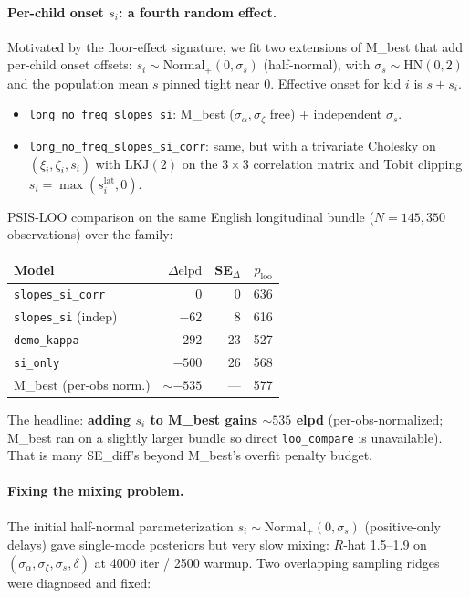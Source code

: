 \documentclass[11pt]{article}
\begin{document}
\paragraph{Per-child onset \(s_i\): a fourth random effect.}
\label{par:s-i}
Motivated by the floor-effect signature, we fit two extensions of
M\_best that add per-child onset offsets:
\(s_i \sim \mathrm{Normal}_+(0, \sigma_s)\) (half-normal), with
\(\sigma_s \sim \mathrm{HN}(0, 2)\) and the population mean \(s\)
pinned tight near 0. Effective onset for kid \(i\) is \(s + s_i\).
\begin{itemize}[leftmargin=1.3em]
\item \texttt{long\_no\_freq\_slopes\_si}: M\_best
  (\(\sigma_\alpha, \sigma_\zeta\) free) + independent \(\sigma_s\).
\item \texttt{long\_no\_freq\_slopes\_si\_corr}: same, but with a
  trivariate Cholesky on \((\xi_i, \zeta_i, s_i)\) with
  \(\mathrm{LKJ}(2)\) on the \(3{\times}3\) correlation matrix and
  Tobit clipping \(s_i = \max(s_i^{\text{lat}}, 0)\).
\end{itemize}
PSIS-LOO comparison on the same English longitudinal bundle
(\(N = 145{,}350\) observations) over the family:
\begin{center}
\begin{tabular}{@{}lrrr@{}}
\toprule
Model & \(\Delta\mathrm{elpd}\) & SE\(_{\Delta}\) & \(p_{\text{loo}}\) \\
\midrule
\texttt{slopes\_si\_corr}  & 0      & 0    & 636 \\
\texttt{slopes\_si} (indep)& \(-62\) & 8   & 616 \\
\texttt{demo\_kappa}       & \(-292\)& 23  & 527 \\
\texttt{si\_only}          & \(-500\)& 26  & 568 \\
M\_best (per-obs norm.)    & \(\sim{-535}\) & --- & 577 \\
\bottomrule
\end{tabular}
\end{center}
The headline: \textbf{adding \(s_i\) to M\_best gains
\(\sim\!535\) elpd} (per-obs-normalized; M\_best ran on a slightly
larger bundle so direct \texttt{loo\_compare} is unavailable). That
is many SE\_diff's beyond M\_best's overfit penalty budget.

\paragraph{Fixing the mixing problem.}
The initial half-normal parameterization
\(s_i \sim \mathrm{Normal}_+(0, \sigma_s)\) (positive-only delays)
gave single-mode posteriors but very slow mixing: \(R\)-hat 1.5--1.9
on \((\sigma_\alpha, \sigma_\zeta, \sigma_s, \delta)\) at 4000 iter /
2500 warmup. Two overlapping sampling ridges were diagnosed and
fixed:
\end{document}
